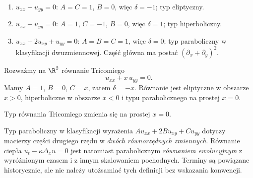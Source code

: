 \begin{przyklad}
\begin{enumerate}
\item $u_{xx}+u_{yy}=0$: $A=C=1$, $B=0$, więc $\delta=-1$;
 typ eliptyczny.
\item $u_{xx}-u_{yy}=0$: $A=1$, $C=-1$, $B=0$, więc
 $\delta=1$; typ hiperboliczny.
\item $u_{xx}+2u_{xy}+u_{yy}=0$: $A=B=C=1$, więc
 $\delta=0$; typ paraboliczny w klasyfikacji dwuzmiennowej.
 Część główna ma postać $(\partial_x+\partial_y)^2$.
\end{enumerate}
\end{przyklad}

\begin{przyklad}
Rozważmy na $\R^2$ równanie Tricomiego
\begin{equation}\label{eq:tricomi}
 u_{xx}+x\,u_{yy}=0.
\end{equation}
Mamy $A=1$, $B=0$, $C=x$, zatem $\delta=-x$. Równanie jest
eliptyczne w obszarze $x>0$, hiperboliczne w obszarze $x<0$
i typu parabolicznego na prostej $x=0$.
\end{przyklad}

\begin{center}
\par\smallskip\small
Typ równania Tricomiego zmienia się na prostej $x=0$.
\end{center}

\begin{uwaga}
Typ paraboliczny w klasyfikacji wyrażenia
$Au_{xx}+2Bu_{xy}+Cu_{yy}$ dotyczy macierzy części
drugiego rzędu w \emph{dwóch równorzędnych zmiennych}.
Równanie ciepła $u_t-\kappa\Delta_xu=0$ jest natomiast
parabolicznym \emph{równaniem ewolucyjnym} z wyróżnionym
czasem i z innym skalowaniem pochodnych. Terminy są
powiązane historycznie, ale nie należy utożsamiać tych
definicji bez wskazania konwencji.
\end{uwaga}

